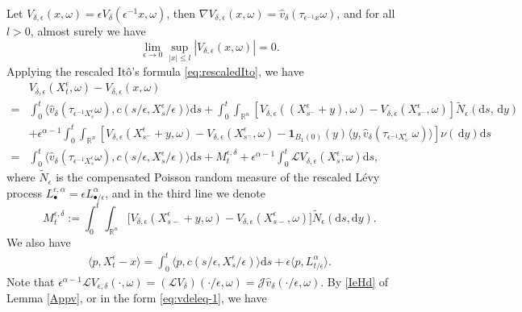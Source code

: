 \documentclass[11pt,reqno]{amsart}
\theoremstyle{definition}
\theoremstyle{remark}
\numberwithin{equation}{section}
\newcommand{\eps}{\epsilon}
\begin{document}
Let ${V}_{\delta,\epsilon}(x,\omega)= \epsilon V_{\delta}(\epsilon^{-1}x, \omega)$, then $\nabla V_{\delta,\epsilon}(x,\omega) = \hat{v}_{\delta}(\tau_{\epsilon^{-1}x}\omega)$, and for all $l>0$, almost surely we have
\begin{equation}\label{VE1}
    \lim_{\epsilon \to 0}\sup_{|x| \leq l} |V_{\delta,\epsilon}(x,\omega)| =0.
\end{equation}
Applying the rescaled It\^{o}'s formula \eqref{eq:rescaledIto}, we have
\begin{align}\label{E4D1}
     & V_{\delta,\epsilon}(X^{\epsilon}_{t},\omega) - V_{\delta,\epsilon}(x,\omega) \nonumber \\
    =& \int_{0}^{t} \langle \hat{v}_{\delta}(\tau_{\epsilon^{-1}X^{\epsilon}_{s}}\omega), c(s/\epsilon, X^{\epsilon}_s/\epsilon) \rangle \mathrm{d}s + \int_{0}^{t} \int_{\mathbb{R}^n} [V_{\delta,\epsilon}((X^{\epsilon}_{s^{-}}+y),\omega) - V_{\delta,\epsilon}(X^{\epsilon}_{s^{-}},\omega)]\widetilde{N}_\epsilon(\mathrm{d}s,  \,\mathrm{d}y)  \nonumber\\
    & + \epsilon^{\alpha - 1}\int_{0}^{t} \int_{\mathbb{R}^n}[V_{\delta,\epsilon}(X^{\epsilon}_{s^{-}}+  y,\omega) - V_{\delta,\epsilon}(X^{\epsilon}_{s^{-}},\omega)-\mathbf{1}_{B_1(0)}(y) \langle y,\hat{v}_{\delta}(\tau_{\epsilon^{-1}X^{\epsilon}_{s^-}}\omega)\rangle]\nu( \,\mathrm{d}y)\mathrm{d}s \nonumber \\
    = & \int_{0}^{ t} \langle \hat{v}_{\delta}(\tau_{\epsilon^{-1}X^{\epsilon}_{s}}\omega), c(s/\epsilon, X^{\epsilon}_{s}/\epsilon) \rangle \mathrm{d}s +   M^{\epsilon,\delta}_t + \epsilon^{\alpha - 1}\int_{0}^{t} \mathscr{L}V_{\delta,\epsilon}(X^{\epsilon}_{s},\omega)\mathrm{d}s,
\end{align}
where $\widetilde{N}_\eps$ is the compensated Poisson random measure of the rescaled L\'evy process $L^{\eps,\alpha}_\bullet = \eps L^\alpha_{\bullet/\eps}$, and in the third line we denote
\begin{equation}
\label{eq:Mbfsplit}
M^{\epsilon,\delta}_t
 :=\int_0^t\int_{\mathbb R^n}
\big[V_{\delta,\epsilon}(X^\epsilon_{s-}+y,\omega)
     -V_{\delta,\epsilon}(X^\epsilon_{s-},\omega)\big]
\widetilde N_\epsilon(\mathrm ds,\mathrm dy).
\end{equation}
We also have
\begin{align}
    \langle p, X^{\epsilon}_t - x \rangle = \int^{t}_{0} \langle p, c(s/\epsilon, X^{\epsilon}_{s}/\epsilon)\rangle \mathrm{d}s + \eps\langle p,  L^{\alpha}_{t/\eps} \rangle.
\end{align}
Note that $\eps^{\alpha-1}\mathscr{L}V_{\eps,\delta}(\cdot,\omega) = (\mathscr{L}V_\delta)(\cdot/\eps,\omega) = \mathscr{J}\hat{v}_\delta(\cdot/\eps,\omega)$. By \eqref{IeHd} of Lemma \ref{Appv}, or in the form \eqref{eq:vdeleq-1}, we have
\end{document}
